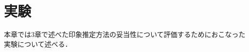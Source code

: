 \documentclass[a4paper,11pt,oneside,openany]{jsbook}
\begin{document}
\chapter{実験}
本章では3章で述べた印象推定方法の妥当性について評価するためにおこなった実験について述べる．





\end{document}
